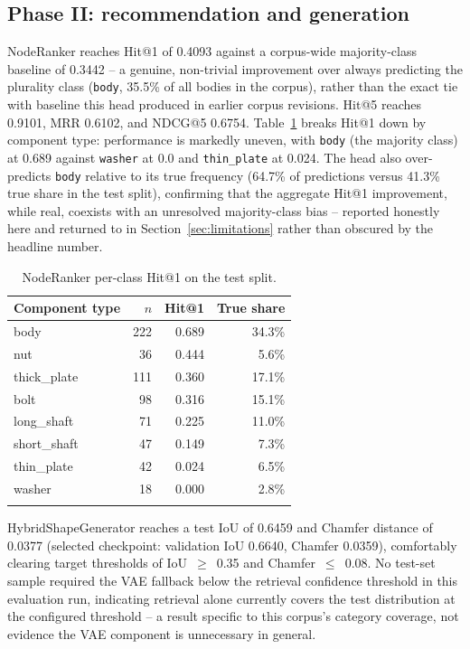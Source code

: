 \documentclass[sn-mathphys,Numbered]{sn-jnl}
\begin{document}
\subsection{Phase II: recommendation and generation}\label{sec:results-phase2}

NodeRanker reaches Hit@1 of 0.4093 against a corpus-wide majority-class baseline of 0.3442 -- a genuine, non-trivial improvement over always predicting the plurality class (\texttt{body}, 35.5\% of all bodies in the corpus), rather than the exact tie with baseline this head produced in earlier corpus revisions. Hit@5 reaches 0.9101, MRR 0.6102, and NDCG@5 0.6754. Table~\ref{tab:perclass} breaks Hit@1 down by component type: performance is markedly uneven, with \texttt{body} (the majority class) at 0.689 against \texttt{washer} at 0.0 and \texttt{thin\_plate} at 0.024. The head also over-predicts \texttt{body} relative to its true frequency (64.7\% of predictions versus 41.3\% true share in the test split), confirming that the aggregate Hit@1 improvement, while real, coexists with an unresolved majority-class bias -- reported honestly here and returned to in Section~\ref{sec:limitations} rather than obscured by the headline number.

\begin{table}[h]
\caption{NodeRanker per-class Hit@1 on the test split.}\label{tab:perclass}
\begin{tabular}{@{}lrrr@{}}
\toprule
Component type & $n$ & Hit@1 & True share \\
\midrule
body        & 222 & 0.689 & 34.3\% \\
nut         & 36  & 0.444 & 5.6\%  \\
thick\_plate & 111 & 0.360 & 17.1\% \\
bolt        & 98  & 0.316 & 15.1\% \\
long\_shaft  & 71  & 0.225 & 11.0\% \\
short\_shaft & 47  & 0.149 & 7.3\%  \\
thin\_plate  & 42  & 0.024 & 6.5\%  \\
washer      & 18  & 0.000 & 2.8\%  \\
\botrule
\end{tabular}
\end{table}

HybridShapeGenerator reaches a test IoU of 0.6459 and Chamfer distance of 0.0377 (selected checkpoint: validation IoU 0.6640, Chamfer 0.0359), comfortably clearing target thresholds of IoU~$\geq$~0.35 and Chamfer~$\leq$~0.08. No test-set sample required the VAE fallback below the retrieval confidence threshold in this evaluation run, indicating retrieval alone currently covers the test distribution at the configured threshold -- a result specific to this corpus's category coverage, not evidence the VAE component is unnecessary in general.
\end{document}
